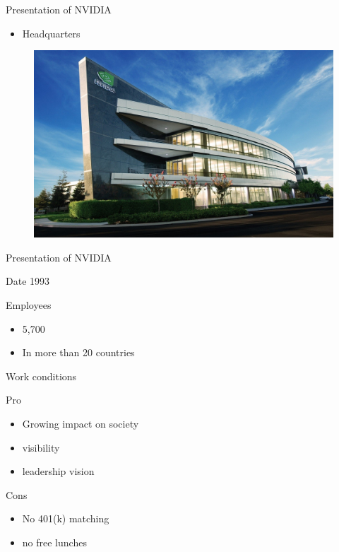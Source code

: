 \documentclass{beamer}
\begin{document}
\begin{frame}{Presentation of NVIDIA}
	\transdissolve[duration=0.08]
	\begin{block}{}
		\begin{itemize}
			\item<+->{Headquarters}
		\end{itemize}
	\end{block}
	\begin{figure}[h]
		\includegraphics[width=1.10\textheight]{NVIDIA_HEADQUARTERS.jpg}
	\end{figure}
\end{frame}


\begin{frame}{Presentation of NVIDIA}
	\begin{block}{Date}
		1993
	\end{block}	

	\pause
	\transdissolve[duration=0.1]

	\begin{block}{Employees}
		\begin{itemize}
			\item<+->{5,700}
			\item<+->{In more than 20 countries}
		\end{itemize}
	\end{block}
\end{frame}

\begin{frame}{Work conditions}
	\begin{block}{Pro}
		\begin{itemize}
			\item<+->{Growing impact on society}
			\item<+->{visibility}
			\item<+->{leadership vision}
		\end{itemize}
	\end{block}
	\begin{block}{Cons}
		\begin{itemize}
			\item<+->{No 401(k) matching}
			\item<+->{no free lunches}
		\end{itemize}
	\end{block}
\end{frame}
\end{document}
